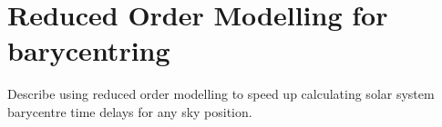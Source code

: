 \section{Reduced Order Modelling for barycentring}

Describe using reduced order modelling to speed up calculating solar system barycentre time delays for any sky position.